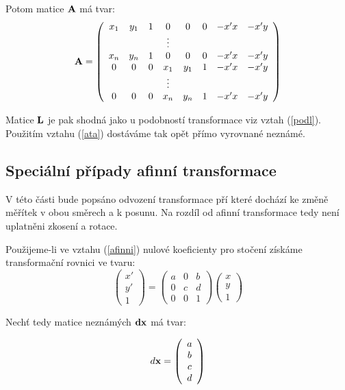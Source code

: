 Potom matice ${\bf A}$ má tvar:
\begin{eqnarray}\label{projA}
{\bf A} = 
\left(
\begin{array}{cccccccc}
x_{1} & y_{1} & 1  &  0    & 0      & 0 & -x'x & -x'y \\
      &       &       &  \vdots     &      &   &   &  \\
x_{n} & y_{n} & 1  &  0    & 0      & 0 & -x'x & -x'y \\
 0    & 0     & 0  &  x_{1} & y_{1} & 1 & -x'x & -x'y \\
      &       &       &  \vdots     &      &   &   &  \\
 0    & 0     & 0  &  x_{n} & y_{n} & 1 & -x'x & -x'y \\
\end{array}
\right)
\end{eqnarray}

Matice ${\bf L}$ je pak shodná jako u podobností transformace viz vztah
(\ref{podl}). Použitím vztahu (\ref{ata}) dostáváme tak opět přímo vyrovnané
neznámé.

\subsection{Speciální případy afinní transformace}

V této části bude popsáno odvození transformace pří které dochází ke změně
měřítek v obou směrech a k posunu. Na rozdíl od afinní transformace tedy není
uplatněni zkosení a rotace.

Použijeme-li ve vztahu (\ref{afinni}) nulové koeficienty pro stočení získáme
transformační rovnici ve tvaru: $$
\left(
\begin{array}{c}
x'\\
y'\\ 
1
\end{array}
\right) 
= 
\left(
\begin{array}{ccc}
a & 0  & b\\
0 &  c & d\\ 
0 & 0 & 1
\end{array}
\right) 
\left(
\begin{array}{c}
x\\
y\\ 
1
\end{array}
\right) 
$$

Nechť tedy matice neznámých ${\bf dx}$ má tvar: 

$$ d{\bf x} =
\left(
\begin{array}{c}
a\\
b\\
c\\
d
\end{array}
\right) $$

